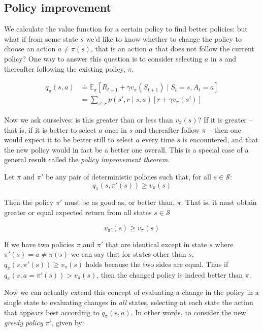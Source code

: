 \subsection{Policy improvement}
We calculate the value function for a certain policy to find better policies: but what if from some state $s$ we'd like to know whether to change the policy to choose an action $a \neq \pi(s)$, that is an action $a$ that does not follow the current policy? One way to answer this question is to consider selecting $a$ in $s$ and thereafter following the existing policy, $\pi$.

\begin{align*}
    q_\pi(s,a) &\doteq \mathbb{E}_\pi[R_{t+1} + \gamma v_\pi(S_{t+1}) \mid S_t=s, A_t = a] \\
               &= \sum_{s',r} p(s',r \mid s,a) \left[r + \gamma v_\pi(s') \right]
\end{align*}

Now we ask ourselves: is this greater than or less than $v_\pi(s)$? If it is greater -- that
is, if it is better to select $a$ once in $s$ and thereafter follow $\pi$ -- then one would expect it to be better still to select $a$ every time $s$ is encountered, and that the new policy would in fact be a better one overall. This is a special case of a general result called the \emph{policy improvement theorem}.

\begin{theorem}
    Let $\pi$ and $\pi'$ be any pair of deterministic policies such that, for all $s \in \mathcal{S}$:
    \[
        q_\pi(s, \pi'(s)) \geq v_\pi(s)
    \]
    
    Then the policy $\pi'$ must be as good as, or better than, $\pi$. That is, it must obtain greater or equal expected return from all states $s \in \mathcal{S}$
    
    \[
        v_{\pi'}(s) \geq v_\pi(s)
    \]
\end{theorem}


If we have two policies $\pi$ and $\pi'$ that are identical except in state $s$ where $\pi'(s) = a \neq \pi(s)$ we can say that for states other than $s$, $q_\pi(s, \pi'(s)) \geq v_\pi(s)$ holds because the two sides are equal. Thus if $q_\pi(s,a=\pi'(s)) > v_\pi(s)$, then the changed policy is indeed better than $\pi$.


Now we can actually extend this concept of evaluating a change in the policy in a single state to evaluating changes in \emph{all} states, selecting at each state the action that appears best according to $q_\pi(s,a)$. In other words, to consider the new \emph{greedy policy} $\pi'$, given by:

